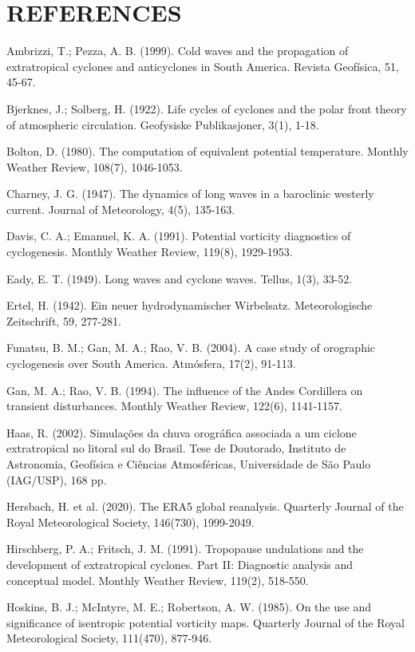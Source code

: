 \documentclass[twocolumn,a4paper,10pt]{article}
\begin{document}
\section*{REFERENCES}
\begin{description}
    \item Ambrizzi, T.; Pezza, A. B. (1999). Cold waves and the propagation of extratropical cyclones and anticyclones in South America. Revista Geof\'isica, 51, 45-67.
    \item Bjerknes, J.; Solberg, H. (1922). Life cycles of cyclones and the polar front theory of atmospheric circulation. Geofysiske Publikasjoner, 3(1), 1-18.
    \item Bolton, D. (1980). The computation of equivalent potential temperature. Monthly Weather Review, 108(7), 1046-1053.
    \item Charney, J. G. (1947). The dynamics of long waves in a baroclinic westerly current. Journal of Meteorology, 4(5), 135-163.
    \item Davis, C. A.; Emanuel, K. A. (1991). Potential vorticity diagnostics of cyclogenesis. Monthly Weather Review, 119(8), 1929-1953.
    \item Eady, E. T. (1949). Long waves and cyclone waves. Tellus, 1(3), 33-52.
    \item Ertel, H. (1942). Ein neuer hydrodynamischer Wirbelsatz. Meteorologische Zeitschrift, 59, 277-281.
    \item Funatsu, B. M.; Gan, M. A.; Rao, V. B. (2004). A case study of orographic cyclogenesis over South America. Atm\'osfera, 17(2), 91-113.
    \item Gan, M. A.; Rao, V. B. (1994). The influence of the Andes Cordillera on transient disturbances. Monthly Weather Review, 122(6), 1141-1157.
    \item Haas, R. (2002). Simula\c{c}\~oes da chuva orogr\'afica associada a um ciclone extratropical no litoral sul do Brasil. Tese de Doutorado, Instituto de Astronomia, Geof\'isica e Ci\^encias Atmosf\'ericas, Universidade de S\~ao Paulo (IAG/USP), 168 pp.
    \item Hersbach, H. et al. (2020). The ERA5 global reanalysis. Quarterly Journal of the Royal Meteorological Society, 146(730), 1999-2049.
    \item Hirschberg, P. A.; Fritsch, J. M. (1991). Tropopause undulations and the development of extratropical cyclones. Part II: Diagnostic analysis and conceptual model. Monthly Weather Review, 119(2), 518-550.
    \item Hoskins, B. J.; McIntyre, M. E.; Robertson, A. W. (1985). On the use and significance of isentropic potential vorticity maps. Quarterly Journal of the Royal Meteorological Society, 111(470), 877-946.

\end{description}
\end{document}
